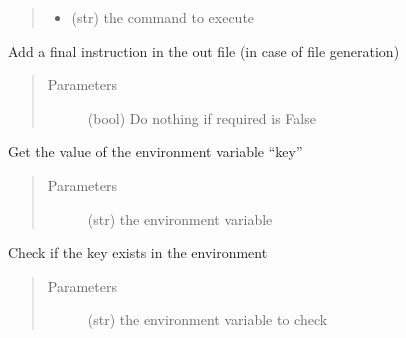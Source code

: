 \documentclass[a4paper,10pt,english]{sphinxmanual}
\begin{document}
\begin{fulllineitems}
\begin{fulllineitems}
\begin{quote}
\begin{description}
\begin{itemize}
\item {} 
 \textendash{} (str) the command to execute

\end{itemize}

\end{description}\end{quote}

\end{fulllineitems}


\begin{fulllineitems}
\label{\detokenize{apidoc_src/src:src.fileEnviron.FileEnviron.finish}}
Add a final instruction in the out file (in case of file generation)
\begin{quote}\begin{description}
\item[{Parameters}] \leavevmode
{} \textendash{} (bool) Do nothing if required is False

\end{description}\end{quote}

\end{fulllineitems}


\begin{fulllineitems}
\label{\detokenize{apidoc_src/src:src.fileEnviron.FileEnviron.get}}
Get the value of the environment variable “key”
\begin{quote}\begin{description}
\item[{Parameters}] \leavevmode
{} \textendash{} (str) the environment variable

\end{description}\end{quote}

\end{fulllineitems}


\begin{fulllineitems}
\label{\detokenize{apidoc_src/src:src.fileEnviron.FileEnviron.is_defined}}
Check if the key exists in the environment
\begin{quote}\begin{description}
\item[{Parameters}] \leavevmode
{} \textendash{} (str) the environment variable to check


\end{description}
\end{quote}
\end{fulllineitems}
\end{fulllineitems}
\end{document}
